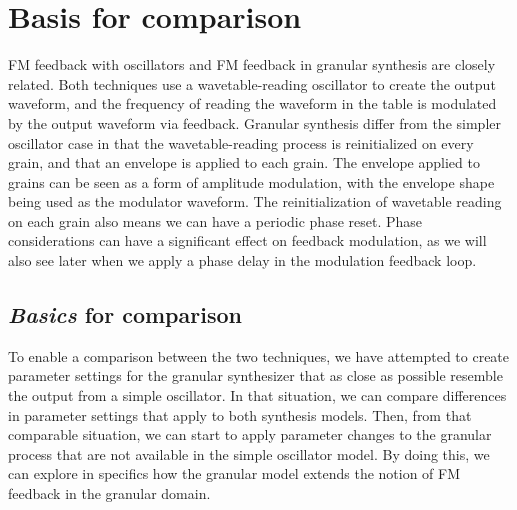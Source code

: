 \documentclass[runningheads,a4paper]{llncs}
\begin{document}
\section{Basis for comparison}
FM feedback with oscillators and FM feedback in granular synthesis are closely related. Both techniques use a wavetable-reading oscillator to create the output waveform, and the frequency of reading the waveform in the table is modulated by the output waveform via feedback. Granular synthesis differ from the simpler oscillator case in that the wavetable-reading process is reinitialized on every grain, and that an envelope is applied to each grain. The envelope applied to grains can be seen as a form of amplitude modulation, with the envelope shape being used as the modulator waveform. The reinitialization of wavetable reading on each grain also means we can have a periodic phase reset. Phase considerations can have a significant effect on feedback modulation, as we will also see later when we apply a phase delay in the modulation feedback loop.

\subsection{\emph{Basics} for comparison}
To enable a comparison between the two techniques, we have attempted to create parameter settings for the granular synthesizer that as close as possible resemble the output from a simple oscillator. In that situation, we can compare differences in parameter settings that apply to both synthesis models. Then, from that comparable situation, we can start to apply parameter changes to the granular process that are not available in the simple oscillator model. By doing this, we can explore in specifics how the granular model extends the notion of FM feedback in the granular domain.
\end{document}
